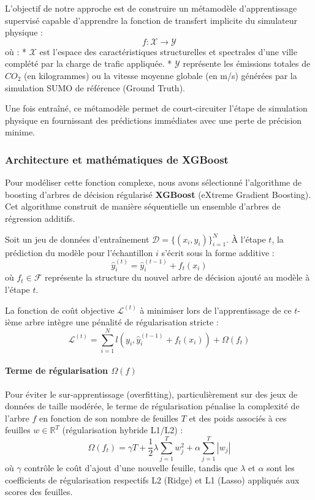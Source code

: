 \documentclass[10pt, a4paper]{article}
\begin{document}
L'objectif de notre approche est de construire un métamodèle
d'apprentissage supervisé capable d'apprendre la fonction de transfert
implicite du simulateur physique : \[f : \mathcal{X} \to \mathcal{Y}\]
où : * \(\mathcal{X}\) est l'espace des caractéristiques structurelles
et spectrales d'une ville complété par la charge de trafic appliquée. *
\(\mathcal{Y}\) représente les émissions totales de \(CO_2\) (en
kilogrammes) ou la vitesse moyenne globale (en m/s) générées par la
simulation SUMO de référence (Ground Truth).

Une fois entraîné, ce métamodèle permet de court-circuiter l'étape de
simulation physique en fournissant des prédictions immédiates avec une
perte de précision minime.

\subsubsection{Architecture et mathématiques de
XGBoost}\label{architecture-et-mathuxe9matiques-de-xgboost}

Pour modéliser cette fonction complexe, nous avons sélectionné
l'algorithme de boosting d'arbres de décision régularisé
\textbf{XGBoost} (eXtreme Gradient Boosting). Cet algorithme construit
de manière séquentielle un ensemble d'arbres de régression additifs.

Soit un jeu de données d'entraînement
\(\mathcal{D} = \{(x_i, y_i)\}_{i=1}^N\). À l'étape \(t\), la prédiction
du modèle pour l'échantillon \(i\) s'écrit sous la forme additive :
\[\hat{y}_i^{(t)} = \hat{y}_i^{(t-1)} + f_t(x_i)\] où
\(f_t \in \mathcal{F}\) représente la structure du nouvel arbre de
décision ajouté au modèle à l'étape \(t\).

La fonction de coût objective \(\mathcal{L}^{(t)}\) à minimiser lors de
l'apprentissage de ce \(t\)-ième arbre intègre une pénalité de
régularisation stricte :
\[\mathcal{L}^{(t)} = \sum_{i=1}^N l\left(y_i, \hat{y}_i^{(t-1)} + f_t(x_i)\right) + \Omega(f_t)\]

\paragraph{\texorpdfstring{Terme de régularisation
\(\Omega(f)\)}{Terme de régularisation \textbackslash Omega(f)}}\label{terme-de-ruxe9gularisation-omegaf}

Pour éviter le sur-apprentissage (overfitting), particulièrement sur des
jeux de données de taille modérée, le terme de régularisation pénalise
la complexité de l'arbre \(f\) en fonction de son nombre de feuilles
\(T\) et des poids associés à ces feuilles \(w \in \mathbb{R}^T\)
(régularisation hybride L1/L2) :
\[\Omega(f_t) = \gamma T + \frac{1}{2} \lambda \sum_{j=1}^T w_j^2 + \alpha \sum_{j=1}^T |w_j|\]
où \(\gamma\) contrôle le coût d'ajout d'une nouvelle feuille, tandis
que \(\lambda\) et \(\alpha\) sont les coefficients de régularisation
respectifs L2 (Ridge) et L1 (Lasso) appliqués aux scores des feuilles.
\end{document}

